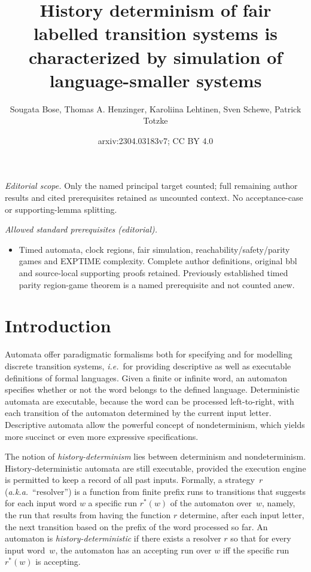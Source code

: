 \documentclass[10pt,a4paper]{amsart}
\title{History determinism of fair labelled transition systems is characterized by simulation of language-smaller systems}
\author{Sougata Bose, Thomas A. Henzinger, Karoliina Lehtinen, Sven Schewe, Patrick Totzke}
\date{arxiv:2304.03183v7; CC BY 4.0}
\theoremstyle{definition}
\numberwithin{equation}{section}
\begin{document}
\maketitle
\noindent\textit{Editorial scope.} Only the named principal target counted; full remaining author results and cited prerequisites retained as uncounted context. No acceptance-case or supporting-lemma splitting.\par\medskip
\noindent\textit{Allowed standard prerequisites (editorial).}\begin{itemize}
\item Timed automata, clock regions, fair simulation, reachability/safety/parity games and EXPTIME complexity. Complete author definitions, original bbl and source-local supporting proofs retained. Previously established timed parity region-game theorem is a named prerequisite and not counted anew.
\end{itemize}\medskip
	\section{Introduction}
	\label{sec:intro}


Automata offer paradigmatic formalisms both for specifying and for modelling
discrete transition systems,
\emph{i.e.}~for providing descriptive as well as executable definitions of
formal languages.
Given a finite or infinite word, an automaton specifies whether or not the
word belongs to the defined language.
Deterministic automata are executable, because the word can be processed
left-to-right, with each transition of the automaton determined by
the current input letter.
Descriptive automata allow the powerful concept of nondeterminism, which
yields more succinct or even more expressive specifications.

The notion of \emph{history-determinism} lies between determinism and
nondeterminism.
History-deterministic automata are still executable, provided the execution
engine is permitted to keep a record of all past inputs. 
Formally, a strategy~$r$ (\emph{a.k.a.}~``resolver'') is a function from
finite prefix runs to transitions that suggests for each input word $w$
a specific run $r^*(w)$ of the automaton over~$w$,
namely, the run that results from having the function $r$ determine, after
each input letter, the next transition based on the prefix of the word
processed so far.
An automaton is \emph{history-deterministic} if there exists a resolver $r$
so that for every input word~$w$, the automaton has an accepting run over
$w$ iff the specific run $r^*(w)$ is accepting.
\end{document}
